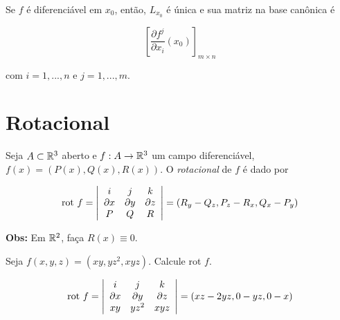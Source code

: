 \documentclass{book}
\begin{document}
\begin{teo}
Se $f$ \'e diferenci\'avel em $x_0$, ent\~ao, $L_{x_0}$ \'e \'unica e sua matriz na base can\^onica \'e

\[
\left[ {\frac{{\partial f^j }}
{{\partial x_i }}\left( {x_0 } \right)} \right]_{m \times n}
\]

com $i = 1,...,n$ e $j = 1,...,m$.
\end{teo}


\section{Rotacional} \label{sec25}

\begin{defn}
\begin{sloppypar}
Seja $A \subset \mathbb{R}^3$ aberto e $f:A \to \mathbb{R}^3$ um campo diferenci\'avel, ${f\left( x \right) = \left( {P\left( x \right),Q\left( x \right),R\left( x \right)} \right)}$. O \textit{rotacional} de $f$ \'e dado por
\end{sloppypar}

\[
{\text{rot }}f = \left| {\begin{array}{*{20}c}
   i & j & k  \\
   {\partial x} & {\partial y} & {\partial z}  \\
   P & Q & R  \\

 \end{array} } \right| = \left( {R_y  - Q_z ,P_z  - R_x ,Q_x  - P_y } \right)
\]

\end{defn}

\textbf{Obs:} Em $\mathbb{R}^2$, fa\c ca $R\left( x \right) \equiv 0$.

\begin{ex}
Seja $f\left( {x,y,z} \right) = \left( {xy,yz^2 ,xyz} \right)$. Calcule rot $f$.
\end{ex}

\begin{sol}
\[
{\text{rot }}f = \left| {\begin{array}{*{20}c}
   i & j & k  \\
   {\partial x} & {\partial y} & {\partial z}  \\
   {xy} & {yz^2 } & {xyz}  \\

 \end{array} } \right| = \left( {xz - 2yz,0 - yz,0 - x} \right)
\]

\end{sol}
\end{document}
